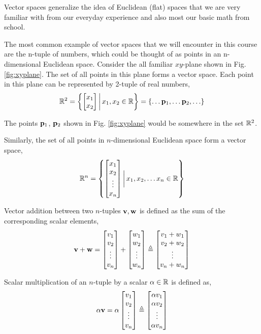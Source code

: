 Vector spaces generalize the idea of Euclidean (flat) spaces that we are very familiar with from our everyday experience and also most our basic math from school.

The most common example of vector spaces that we will encounter in this course are the n-tuple of numbers, which could be thought of as points in an n-dimensional Euclidean space. Consider the all familiar $xy$-plane shown in Fig. \ref{fig:xyplane}. The set of all points in this plane forms a vector space. Each point in this plane can be represented by 2-tuple of real numbers,
\[ \mb{R}^2 = \lc \bmx x_1 \\ x_2 \emx \bigg\vert \, x_1, x_2 \in \mb{R} \rc  = \lc \ldots \mf{p}_1, \ldots \mf{p}_2, \ldots \rc \]

\noindent The points $\mathbf{p}_1$, $\mathbf{p}_2$ shown in Fig. \ref{fig:xyplane} would be somewhere in the set $\mathbb{R}^2$.

Similarly, the set of all points in $n$-dimensional Euclidean space form a vector space,
\[ \mb{R}^n = \lc \bmxc x_1 \\ x_2 \\ \vdots \\ x_n \emx \bigg\vert \, x_1, x_2, \ldots x_n \in \mb{R} \rc \]

Vector addition between two $n$-tuples $\mathbf{v}, \mathbf{w}$ is defined as the sum of the corresponding scalar elements,
\[ \mf{v} + \mf{w} = \bmxc v_1 \\ v_2 \\ \vdots \\ v_n\emx + \bmxc w_1 \\ w_2 \\ \vdots \\ w_n \emx \triangleq \bmxc v_1 + w_1 \\ v_2 + w_2 \\ \vdots \\ v_n + w_n\emx \]

Scalar multiplication of an $n$-tuple by a scalar $\alpha \in \mathbb{R}$ is defined as,
\[ \alpha \mf{v} = \alpha \bmxc v_1 \\ v_2 \\ \vdots \\ v_n \emx \triangleq \bmxc \alpha v_1 \\ \alpha v_2 \\ \vdots \\ \alpha v_n \emx   \]

